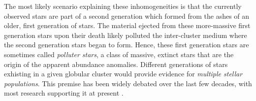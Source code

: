 


The most likely scenario explaining these inhomogeneities is that the currently observed stars are part of a second generation which formed from the ashes of an older, first generation of stars. The material ejected from these more-massive first generation stars upon their death likely polluted the inter-cluster medium where the second generation stars began to form. Hence, these first generation stars are sometimes called \emph{polluter stars}, a class of massive, extinct stars that are the origin of the apparent abundance anomalies. Different generations of stars exhisting in a given globular cluster would provide evidence for \emph{multiple stellar populations}. This premise has been widely debated over the last few decades, with most research supporting it at present \cite{Gratton2004,Gratton2012,Gratton2019}.


